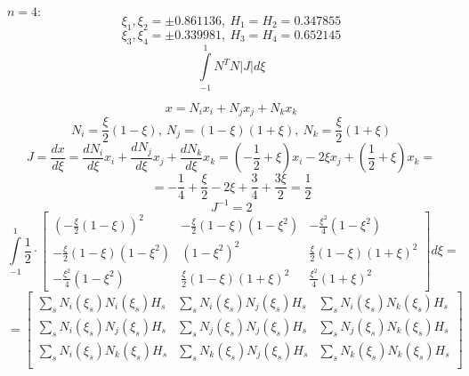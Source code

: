 \documentclass{bmstu}
\begin{document}
$n = 4:$
\[
\xi_1, \xi_2 = \pm 0.861136,\ H_1 = H_2 = 0.347855
\]
\[
\xi_3, \xi_4 = \pm 0.339981,\ H_3 = H_4 = 0.652145
\]
\newpage
\[
\int \limits_{-1}^1 N^T N |J| d\xi
\]
\begin{center}
\end{center}
\[
x = N_ix_i + N_j x_j + N_k x_k 
\]
\[
N_i = \frac{\xi}{2} (1 - \xi),\ N_j = (1-\xi)(1+\xi),\ N_k = \frac{\xi}{2} (1 + \xi)
\]
\[
J = \frac{dx}{d\xi} = \frac{dN_i}{d\xi}x_i + \frac{dN_j}{d\xi}x_j + \frac{dN_k}{d\xi}x_k = \left( -\frac{1}{2} + \xi \right) x_i - 2\xi x_j + \left(\frac{1}{2} + \xi \right) x_k =
\]
\[
= -\frac{1}{4} + \frac{\xi}{2} - 2\xi + \frac{3}{4} + \frac{3\xi}{2} = \frac{1}{2}
\]
\[
J^{-1} = 2
\]
\[
\int \limits_{-1}^1 \frac{1}{2} \cdot 
\begin{bmatrix} 
\left(-\frac{\xi}{2} (1 - \xi) \right)^2 & -\frac{\xi}{2} (1-\xi)(1-\xi^2) & -\frac{\xi^2}{4} (1 - \xi^2) \\
-\frac{\xi}{2} (1-\xi)(1-\xi^2) & (1-\xi^2)^2 & \frac{\xi}{2} (1-\xi)(1+\xi)^2 \\
-\frac{\xi^2}{4} (1 - \xi^2) & \frac{\xi}{2} (1-\xi)(1+\xi)^2 & \frac{\xi^2}{4} (1+\xi)^2
\end{bmatrix} d\xi = 
\]
\begin{equation}\label{matrix_form}
= \begin{bmatrix} 
\sum \limits_s N_i (\xi_s) N_i(\xi_s) H_s  & \sum \limits_s N_i (\xi_s) N_j(\xi_s) H_s & \sum \limits_s N_i (\xi_s) N_k(\xi_s) H_s \\
\sum \limits_s N_i (\xi_s) N_j(\xi_s) H_s  & \sum \limits_s N_j (\xi_s) N_j(\xi_s) H_s & \sum \limits_s N_j (\xi_s) N_k(\xi_s) H_s \\
\sum \limits_s N_i (\xi_s) N_k(\xi_s) H_s  & \sum \limits_s N_k (\xi_s) N_j(\xi_s) H_s & \sum \limits_s N_k (\xi_s) N_k(\xi_s) H_s \\
\end{bmatrix}
\end{equation}
\end{document}
